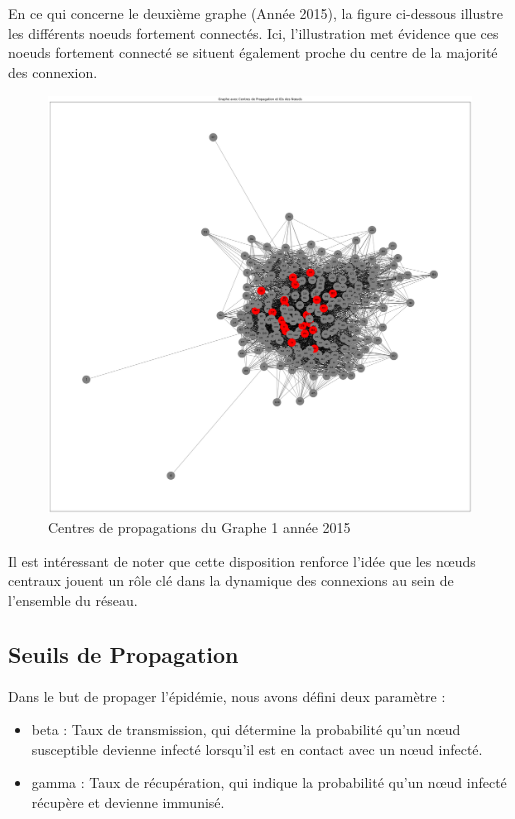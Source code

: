 \documentclass{article}
\begin{document}
\clearpage
\newpage
En ce qui concerne le deuxième graphe (Année 2015), la figure ci-dessous illustre les différents noeuds fortement connectés. Ici, l'illustration met évidence que ces noeuds fortement connecté se situent également proche du centre de la majorité des connexion.

\begin{figure}[!h]
    \centering
    \includegraphics[width=15cm]{assets/epidemiologie/centre_propa_2015}
    \caption{Centres de propagations du Graphe 1 année 2015}
    \label{fig:centre_propa_2015}
\end{figure}

Il est intéressant de noter que cette disposition renforce l'idée que les nœuds centraux jouent un rôle clé dans la dynamique des connexions au sein de l'ensemble du réseau.

\clearpage
\newpage
\subsection{Seuils de Propagation}

Dans le but de propager l'épidémie, nous avons défini deux paramètre :
\begin{itemize}
    \item beta : Taux de transmission, qui détermine la probabilité qu'un nœud susceptible devienne infecté lorsqu'il est en contact avec un nœud infecté.
    \item gamma : Taux de récupération, qui indique la probabilité qu'un nœud infecté récupère et devienne immunisé. \\
\end{itemize}
\end{document}
